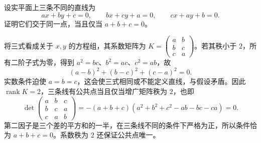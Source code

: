 \begin{example}
\label{ex:laex-three-lines}
设实平面上三条不同的直线为
\[
ax+by+c=0,\qquad bx+cy+a=0,\qquad cx+ay+b=0.
\]
证明它们交于同一点，当且仅当 $a+b+c=0$。
\end{example}

\begin{solve}
将三式看成关于 $x,y$ 的方程组，其系数矩阵为 $K=\begin{pmatrix}a&b\\b&c\\c&a\end{pmatrix}$。若其秩小于 $2$，所有二阶子式为零，得到 $a^2=bc$、$b^2=ac$、$c^2=ab$，故
\[
(a-b)^2+(b-c)^2+(c-a)^2=0.
\]
实数条件迫使 $a=b=c$，这会使三式相同或不能定义直线，与假设矛盾。因此 $\operatorname{rank}K=2$，三条线有公共点当且仅当增广矩阵秩为 $2$，也即
\[
\det\begin{pmatrix}a&b&c\\b&c&a\\c&a&b\end{pmatrix}
=-(a+b+c)(a^2+b^2+c^2-ab-bc-ca)=0.
\]
第二因子是三个差的平方和的一半，在三条线不同的条件下严格为正，所以条件恰为 $a+b+c=0$。系数秩为 $2$ 还保证公共点唯一。
\end{solve}





